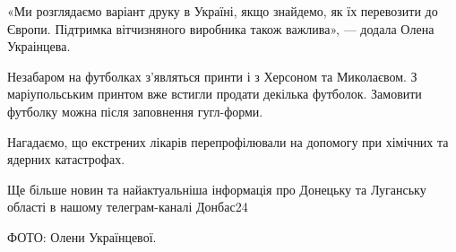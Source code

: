 «Ми розглядаємо варіант друку в Україні, якщо знайдемо, як їх перевозити до
Європи. Підтримка вітчизняного виробника також важлива», — додала Олена
Украінцева.

Незабаром на футболках з'являться принти і з Херсоном та Миколаєвом. З
маріупольським принтом вже встигли продати декілька футболок. Замовити футболку
можна після заповнення гугл-форми. 

Нагадаємо, що екстрених лікарів перепрофілювали на допомогу при хімічних та ядерних катастрофах.

Ще більше новин та найактуальніша інформація про Донецьку та Луганську області в нашому телеграм-каналі Донбас24

ФОТО: Олени Українцевої.
